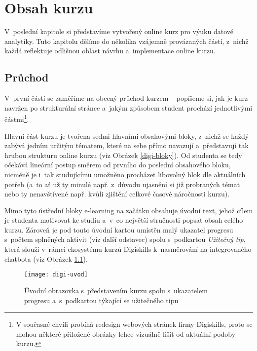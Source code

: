 \hypertarget{obsah-kurzu}{%
\chapter{Obsah kurzu}\label{obsah-kurzu}}

V~poslední kapitole si představíme vytvořený online kurz pro výuku datové analytiky. Tuto kapitolu dělíme do několika vzájemně provázaných částí, z~nichž každá reflektuje odlišnou oblast návrhu a~implementace online kurzu.

\hypertarget{prux16fchod}{%
\section{Průchod}\label{prux16fchod}}

V~první částí se zaměříme na obecný průchod kurzem -- popíšeme si, jak je kurz navržen po strukturální stránce a~jakým způsobem student prochází jednotlivými částmi\footnote{V současné chvíli probíhá redesign webových stránek firmy Digiskills, proto se mohou některé přiložené obrázky lehce vizuálně lišit od aktuální podoby kurzu.}.

Hlavní část kurzu je tvořena sedmi hlavními obsahovými bloky, z~nichž se každý zabývá jedním určitým tématem, které na sebe přímo navazují a~představují tak hrubou strukturu online kurzu (viz Obrázek \ref{digi-bloky}). Od studenta se tedy očekává lineární postup směrem od prvního do poslední obsahového bloku, nicméně je i~tak studujícímu umožněno procházet libovolný blok dle aktuálních potřeb (a~to ať už ty minulé např. z~důvodu ujasnění si již probraných témat nebo ty nenavštívené např. kvůli zjištění celkové časové náročnosti kurzu).

Mimo tyto ústřední bloky e-learning na začátku obsahuje úvodní text, jehož cílem je studenta motivovat ke studiu a~v~co největší stručnosti popsat obsah celého kurzu. Zároveň je pod touto úvodní kartou umístěn malý ukazatel progresu s~počtem splněných aktivit (viz další odstavec) spolu s~podkartou \emph{Užitečný tip}, která slouží v~rámci ekosystému kurzů Digiskills k~nasměrování na integrovaného chatbota (viz Obrázek \ref{digi-uvod}).

\begin{figure}[h]   
    \centering
    \texttt{[image: digi-uvod]}  
    \caption{Úvodní obrazovka s~představením kurzu spolu s~ukazatelem progresu a~s~podkartou týkající se užitečného tipu}
    \label{digi-uvod}
\end{figure}

